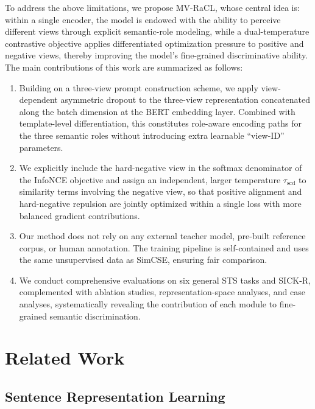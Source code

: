 \documentclass[a4paper,fleqn]{cas-dc}
\begin{document}
To address the above limitations, we propose MV-RaCL, whose central idea is: within a single encoder, the model is endowed with the ability to perceive different views through explicit semantic-role modeling, while a dual-temperature contrastive objective applies differentiated optimization pressure to positive and negative views, thereby improving the model's fine-grained discriminative ability. The main contributions of this work are summarized as follows:

\begin{enumerate}
\item Building on a three-view prompt construction scheme, we apply view-dependent asymmetric dropout to the three-view representation concatenated along the batch dimension at the BERT embedding layer. Combined with template-level differentiation, this constitutes role-aware encoding paths for the three semantic roles without introducing extra learnable ``view-ID'' parameters.

\item We explicitly include the hard-negative view in the softmax denominator of the InfoNCE objective and assign an independent, larger temperature $\tau_{\mathrm{scd}}$ to similarity terms involving the negative view, so that positive alignment and hard-negative repulsion are jointly optimized within a single loss with more balanced gradient contributions.

\item Our method does not rely on any external teacher model, pre-built reference corpus, or human annotation. The training pipeline is self-contained and uses the same unsupervised data as SimCSE, ensuring fair comparison.

\item We conduct comprehensive evaluations on six general STS tasks and SICK-R, complemented with ablation studies, representation-space analyses, and case analyses, systematically revealing the contribution of each module to fine-grained semantic discrimination.
\end{enumerate}

\section{Related Work}
\label{sec:related}

\subsection{Sentence Representation Learning}
\end{document}
